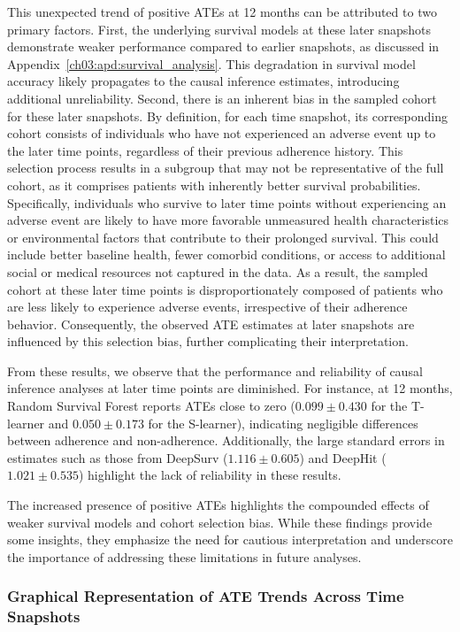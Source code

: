 This unexpected trend of positive ATEs at 12 months can be attributed to two primary factors.
First, the underlying survival models at these later snapshots demonstrate weaker performance compared to earlier snapshots, as discussed in Appendix~\ref{ch03:apd:survival_analysis}.
This degradation in survival model accuracy likely propagates to the causal inference estimates, introducing additional unreliability.
Second, there is an inherent bias in the sampled cohort for these later snapshots.
By definition, for each time snapshot, its corresponding cohort consists of individuals who have not experienced an adverse event up to the later time points, regardless of their previous adherence history.
This selection process results in a subgroup that may not be representative of the full cohort, as it comprises patients with inherently better survival probabilities.
Specifically, individuals who survive to later time points without experiencing an adverse event are likely to have more favorable unmeasured health characteristics or environmental factors that contribute to their prolonged survival.
This could include better baseline health, fewer comorbid conditions, or access to additional social or medical resources not captured in the data.
As a result, the sampled cohort at these later time points is disproportionately composed of patients who are less likely to experience adverse events, irrespective of their adherence behavior.
Consequently, the observed ATE estimates at later snapshots are influenced by this selection bias, further complicating their interpretation.

From these results, we observe that the performance and reliability of causal inference analyses at later time points are diminished.
For instance, at 12 months, Random Survival Forest reports ATEs close to zero (\(0.099 \pm 0.430\) for the T-learner and \(0.050 \pm 0.173\) for the S-learner), indicating negligible differences between adherence and non-adherence.
Additionally, the large standard errors in estimates such as those from DeepSurv (\(1.116 \pm 0.605\)) and DeepHit (\(1.021 \pm 0.535\)) highlight the lack of reliability in these results.

The increased presence of positive ATEs highlights the compounded effects of weaker survival models and cohort selection bias.
While these findings provide some insights, they emphasize the need for cautious interpretation and underscore the importance of addressing these limitations in future analyses.

\subsubsection{Graphical Representation of ATE Trends Across Time Snapshots}
\label{ch03:apd:graphical_ate}

